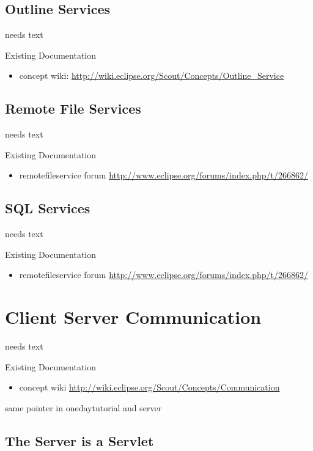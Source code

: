 \documentclass[a4paper,10pt,twoside]{book}
\begin{document}
\section{Outline Services}
needs text

\noindent Existing Documentation
\begin{itemize}
  \item concept wiki: \url{http://wiki.eclipse.org/Scout/Concepts/Outline_Service}
\end{itemize}

\section{Remote File Services}
needs text

\noindent Existing Documentation
\begin{itemize}
  \item remotefileservice forum \url{http://www.eclipse.org/forums/index.php/t/266862/}
\end{itemize}

\section{SQL Services}
needs text

\noindent Existing Documentation
\begin{itemize}
  \item remotefileservice forum \url{http://www.eclipse.org/forums/index.php/t/266862/}
\end{itemize}

\chapter{Client Server Communication}
needs text

\noindent Existing Documentation
\begin{itemize}
  \item concept wiki \url{http://wiki.eclipse.org/Scout/Concepts/Communication}
\end{itemize}

same pointer in onedaytutorial and server

\section{The Server is a Servlet}
\end{document}
